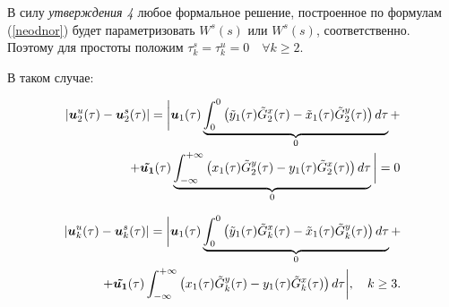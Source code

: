 В силу \textit{утверждения 4} любое формальное решение, построенное по формулам (\ref{neodnor}) будет параметризовать $W^s(s)$ или $W^s(s)$, соответственно. Поэтому для простоты положим $\tau_k^s = \tau_k^u = 0 \quad \forall k \ge 2$. 

В таком случае:

\begin{multline*}
\begin{aligned}
        |\boldsymbol{u}_2^u(\tau)-\boldsymbol{u}_2^s(\tau)| = \bigg| \boldsymbol{u}_1(\tau) \underbrace{\int_{0}^{0} \left( \tilde y_1(\tau) \tilde G_2^x(\tau) - \tilde x_1(\tau) \tilde G_2^y(\tau) \right) d \tau}_0 + \\
        +\boldsymbol{ \tilde{u_1}}(\tau) \underbrace{\int_{-\infty}^{+\infty} \left( x_1(\tau) \tilde G_2^y(\tau) - y_1(\tau) \tilde G_2^x(\tau) \right) d \tau}_0 \bigg| = 0
\end{aligned}
\end{multline*}

\begin{multline*}
\begin{aligned}
        |\boldsymbol{u}_k^u(\tau)-\boldsymbol{u}_k^s(\tau)| = \bigg| \boldsymbol{u}_1(\tau) \underbrace{\int_{0}^{0} \left( \tilde y_1(\tau) \tilde G_k^x(\tau) - \tilde x_1(\tau) \tilde G_k^y(\tau) \right) d \tau}_0 + \\
        +\boldsymbol{ \tilde{u_1}}(\tau) \int_{-\infty}^{+\infty} \left( x_1(\tau) \tilde G_k^y(\tau) - y_1(\tau) \tilde G_k^x(\tau) \right) d \tau \bigg|, \quad k \ge 3.
\end{aligned}
\end{multline*}
